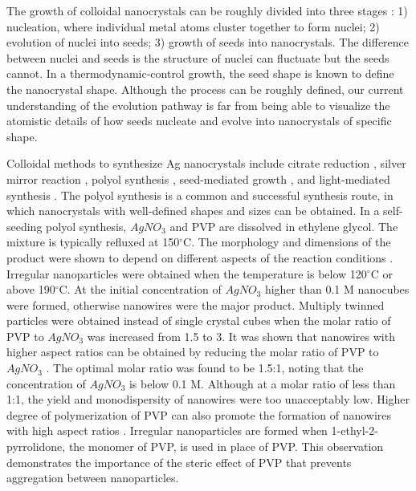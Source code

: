 The growth of colloidal nanocrystals can be roughly divided into three stages \cite{Xia_2008}:
1) nucleation, where individual metal atoms cluster together to form nuclei;
2) evolution of nuclei into seeds;
3) growth of seeds into nanocrystals.
The difference between nuclei and seeds is the structure of nuclei can fluctuate but the seeds cannot.
In a thermodynamic-control growth, the seed shape is known to define the nanocrystal shape.
Although the process can be roughly defined, our current understanding of the evolution pathway is far from being able to visualize the atomistic details of how seeds nucleate and evolve into nanocrystals of specific shape.

Colloidal methods to synthesize Ag nanocrystals include citrate reduction \cite{Wu_2008,Lee_1982}, silver mirror reaction \cite{Yin_2002}, polyol synthesis \cite{Wiley_2008,Sun_2002}, seed-mediated growth \cite{Pietrobon_2009,Sun_2002,Zhang_2010}, and light-mediated synthesis \cite{Pietrobon_2008,Jin_2003,Zhou_2008}.
The polyol synthesis is a common and successful synthesis route, in which nanocrystals with well-defined shapes and sizes can be obtained.
In a self-seeding polyol synthesis, $AgNO_3$ and PVP are dissolved in ethylene glycol.
The mixture is typically refluxed at 150$^{\circ}$C.
The morphology and dimensions of the product were shown to depend on different aspects of the reaction conditions \cite{Sun_2002}.
Irregular nanoparticles were obtained when the temperature is below 120$^{\circ}$C or above 190$^{\circ}$C.
At the initial concentration of $AgNO_3$ higher than 0.1 M nanocubes were formed, otherwise nanowires were the major product.
Multiply twinned particles were obtained instead of single crystal cubes when the molar ratio of PVP to $AgNO_3$ was increased from 1.5 to 3.
It was shown that nanowires with higher aspect ratios can be obtained by reducing the molar ratio of PVP to $AgNO_3$ \cite{Sun_2002}.
The optimal molar ratio was found to be 1.5:1, noting that the concentration of $AgNO_3$ is below 0.1 M.
Although at a molar ratio of less than 1:1, the yield and monodispersity of nanowires were too unacceptably low.
Higher degree of polymerization of PVP can also promote the formation of nanowires with high aspect ratios \cite{Sun_2002}.
Irregular nanoparticles are formed when 1-ethyl-2-pyrrolidone, the monomer of PVP, is used in place of PVP.
This observation demonstrates the importance of the steric effect of PVP that prevents aggregation between nanoparticles.

